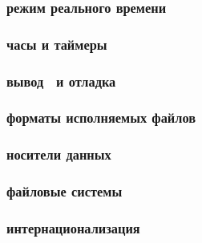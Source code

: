{

\subsubsection{режим реального времени}



\subsubsection{часы и таймеры}



\subsubsection{вывод \ и отладка}



\subsubsection{форматы исполняемых файлов}



\subsubsection{носители данных}



\subsubsection{файловые системы}



\subsubsection{интернационализация}



}
